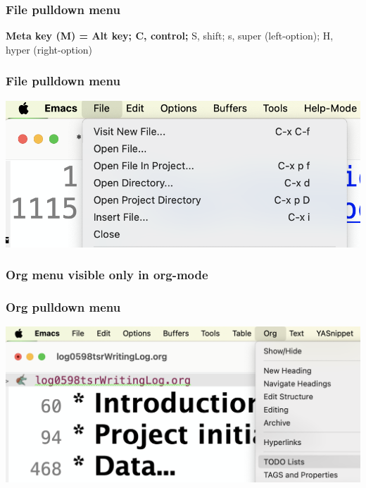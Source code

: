 \documentclass[aspectratio=169]{beamer}
\begin{document}
\subsubsection{File pulldown menu}
\begin{frame}
\textbf{Meta key (M) = Alt key; C, control;} S, shift; s, super (left-option); H, hyper (right-option)
\frametitle{File pulldown menu}
\begin{center}
    \includegraphics[scale=0.85]{Figures/filePulldownCropped.png}
\end{center}
\end{frame}


\subsubsection{Org menu visible only in org-mode}
\begin{frame}
\frametitle{Org pulldown menu}
\begin{center}
    \includegraphics[scale=0.7]{Figures/orgPulldownCropped.png}
\end{center}
\end{frame}
\end{document}
